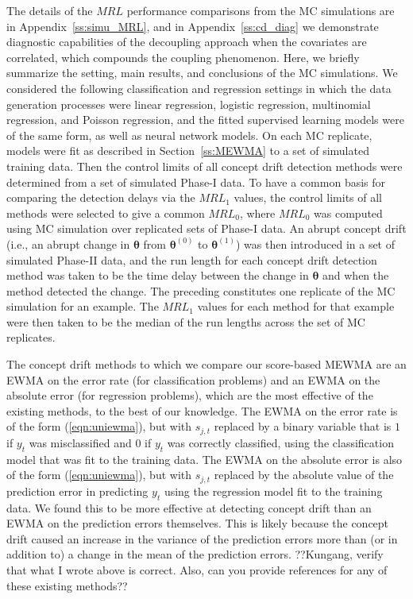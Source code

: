\documentclass[twoside,11pt]{article}
\begin{document}
The details of the $MRL$ performance comparisons from the MC simulations are in Appendix~\ref{ss:simu_MRL}, and in Appendix~\ref{ss:cd_diag} we demonstrate diagnostic capabilities of the decoupling approach when the covariates are correlated, which compounds the coupling phenomenon. Here, we briefly summarize the setting, main results, and conclusions of the MC simulations. We considered the following classification and regression settings in which the data generation processes were linear regression, logistic regression, multinomial regression, and Poisson regression, and the fitted supervised learning models were of the same form, as well as neural network models. On each MC replicate, models were fit as described in Section~\ref{ss:MEWMA} to a set of simulated training data. Then the control limits of all concept drift detection methods were determined from a set of simulated Phase-I data. To have a common basis for comparing the detection delays via the $MRL_1$ values, the control limits of all methods were selected to give a common $MRL_0$, where $MRL_0$ was computed using MC simulation over replicated sets of Phase-I data. An abrupt concept drift (i.e., an abrupt change in $\bm{\theta}$ from $\bm{\theta}^{(0)}$ to $\bm{\theta}^{(1)}$) was then introduced in a set of simulated Phase-II data, and the run length for each concept drift detection method was taken to be the time delay between the change in $\bm{\theta}$ and when the method detected the change. The preceding constitutes one replicate of the MC simulation for an example. The $MRL_1$ values for each method for that example were then taken to be the median of the run lengths across the set of MC replicates.

The concept drift methods to which we compare our score-based MEWMA are an EWMA on the error rate (for classification problems) and an EWMA on the absolute error (for regression problems), which are the most effective of the existing methods, to the best of our knowledge. The EWMA on the error rate is of the form (\ref{eqn:uniewma}), but with $s_{j,t}$ replaced by a binary variable that is $1$ if $y_t$ was misclassified and $0$ if $y_t$ was correctly classified, using the classification model that was fit to the training data. The EWMA on the absolute error is also of the form (\ref{eqn:uniewma}), but with $s_{j,t}$ replaced by the absolute value of the prediction error in predicting $y_t$ using the regression model fit to the training data. We found this to be more effective at detecting concept drift than an EWMA on the prediction errors themselves. This is likely because the concept drift caused an increase in the variance of the prediction errors more than (or in addition to) a change in the mean of the prediction errors. ??Kungang, verify that what I wrote above is correct. Also, can you provide references for any of these existing methods??
\end{document}
